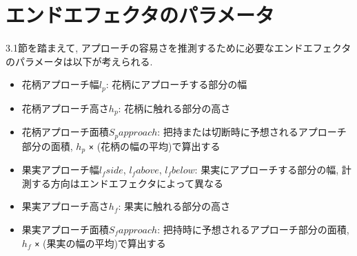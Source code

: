 \section{エンドエフェクタのパラメータ}
3.1節を踏まえて, アプローチの容易さを推測するために必要なエンドエフェクタのパラメータは以下が考えられる.

\begin{itemize}
  \item 花柄アプローチ幅$l_p$: 花柄にアプローチする部分の幅
  \item 花柄アプローチ高さ$h_p$: 花柄に触れる部分の高さ
  \item 花柄アプローチ面積$S_papproach$: 把持または切断時に予想されるアプローチ部分の面積, $h_p$ \verb|×| (花柄の幅の平均)で算出する
  \item 果実アプローチ幅$l_fside$, $l_fabove$, $l_fbelow$: 果実にアプローチする部分の幅, 計測する方向はエンドエフェクタによって異なる
  \item 果実アプローチ高さ$h_f$: 果実に触れる部分の高さ
  \item 果実アプローチ面積$S_fapproach$: 把持時に予想されるアプローチ部分の面積, $h_f$ \verb|×| (果実の幅の平均)で算出する
\end{itemize}